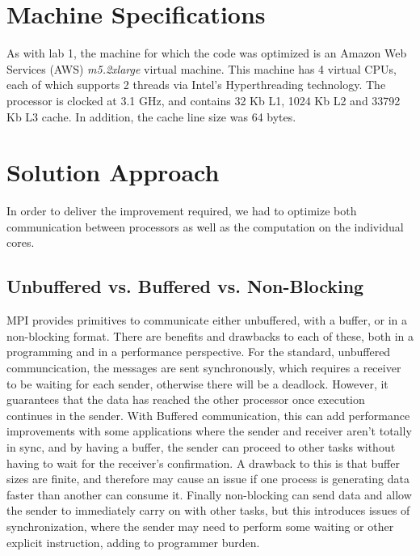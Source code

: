 \documentclass[letterpaper,twocolumn,10pt]{article}
\begin{document}
\section{Machine Specifications}

As with lab 1, the machine for which the code was optimized is an Amazon Web 
Services (AWS) \textit{m5.2xlarge} virtual machine. This machine has 4 virtual 
CPUs, each of which supports 2 threads via Intel's Hyperthreading technology. 
The processor is clocked at 3.1 GHz, and contains 32 Kb L1, 1024 Kb L2 and 
33792 Kb L3 cache. In addition, the cache line size was 64 bytes.

\section{Solution Approach}
In order to deliver the improvement required, we had to optimize both 
communication between processors as well as the computation on the individual
cores.

\subsection{Unbuffered vs. Buffered vs. Non-Blocking}
MPI provides primitives to communicate either unbuffered, with a buffer, or in
a non-blocking format. There are benefits and drawbacks to each of these, both
in a programming and in a performance perspective. For the standard, unbuffered
communcication, the messages are sent synchronously, which requires a receiver
to be waiting for each sender, otherwise there will be a deadlock. However, it
guarantees that the data has reached the other processor once execution
continues in the sender. With Buffered communication, this can add performance
improvements with some applications where the sender and receiver aren't
totally in sync, and by having a buffer, the sender can proceed to other tasks
without having to wait for the receiver's confirmation. A drawback to this is
that buffer sizes are finite, and therefore may cause an issue if one process
is generating data faster than another can consume it. Finally non-blocking can
send data and allow the sender to immediately carry on with other tasks, but
this introduces issues of synchronization, where the sender may need to perform
some waiting or other explicit instruction, adding to programmer burden.
\end{document}
